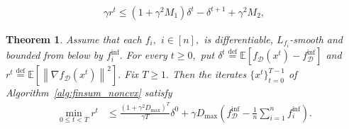 \documentclass[10pt,a4paper]{amsart}
\newtheorem{theorem}{Theorem}
\newcommand{\eqdef}{\stackrel{\text{def}}{=}}
\newcommand{\tf}{f_{\mathcal{D}}}
\begin{document}
	\begin{equation}
		\begin{split}
			\gamma r^t \leq \left(1 + \gamma^2 M_1\right)\delta^t - \delta^{t+1} + \gamma^2 M_2,
		\end{split}
	\end{equation}

\begin{theorem}
	Assume that each $f_i,$ $i\in[n],$ is differentiable, $L_{f_i}$-smooth and bounded from below by $f_i^{\inf}.$ For every $t\geq 0,$ put $\delta^t\eqdef\mathbb{E}\left[\tf(x^t)-\tf^{\inf}\right]$ and $r^t\eqdef\mathbb{E}\left[\left\|\nabla \tf(x^t)\right\|^2\right].$ Fix $T\geq 1.$ Then the iterates $\{x^t\}_{t=0}^{T-1}$ of Algorithm~\ref{alg:finsum_noncvx} satisfy
	\begin{equation}\label{eq:main_noncvx_finite_sum}
		\begin{split}
			\min_{0 \leq t < T}r^t &\leq \frac{\left(1+\gamma^2D_{\max}\right)^T}{\gamma T}\delta^0 + \gamma D_{\max}\left(\tf^{\inf} - \frac{1}{n}\sum_{i=1}^{n}f^{\inf}_i\right).
		\end{split}
	\end{equation}
\end{theorem}
\end{document}
